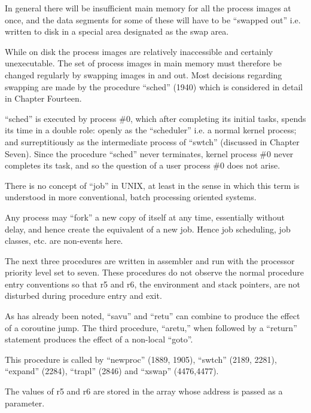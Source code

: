 
In general there will be insufficient
main memory for all the process images
at once, and the data segments for some
of these will have to be ``swapped out''
i.e. written to disk in a special area
designated as the swap area.

While on disk the process images are
relatively inaccessible and certainly
unexecutable. The set of process
images in main memory must therefore be
changed regularly by swapping images in
and out. Most decisions regarding
swapping are made by the procedure
``sched'' (1940) which is considered in
detail in Chapter Fourteen.

``sched'' is executed by process \#0,
which after completing its initial
tasks, spends its time in a double
role: openly as the ``scheduler'' i.e. a
normal kernel process; and surreptitiously as the intermediate process of
``swtch'' (discussed in Chapter Seven).
Since the procedure ``sched'' never terminates,
kernel process \#0 never completes its task, and so the question of
a user process \#0 does not arise.



There is no concept of ``job'' in UNIX,
at least in the sense in which this
term is understood in more conventional, batch processing oriented systems.

Any process may ``fork'' a new copy of
itself at any time, essentially without
delay, and hence create the equivalent
of a new job. Hence job scheduling,
job classes, etc. are non-events here.


The next three procedures are written
in assembler and run with the processor
priority level set to seven. These
procedures do not observe the normal
procedure entry conventions so that r5
and r6, the environment and stack
pointers, are not disturbed during procedure entry and exit.

As has already been noted, ``savu'' and
``retu'' can combine to produce the
effect of a coroutine jump. The third
procedure, ``aretu,'' when followed by a
``return'' statement produces the effect
of a non-local ``goto''.



This procedure is called by ``newproc''
(1889, 1905), ``swtch'' (2189, 2281),
``expand'' (2284), ``trapl'' (2846) and
``xswap'' (4476,4477).

The values of r5 and r6 are stored in
the array whose address is passed as a
parameter.


